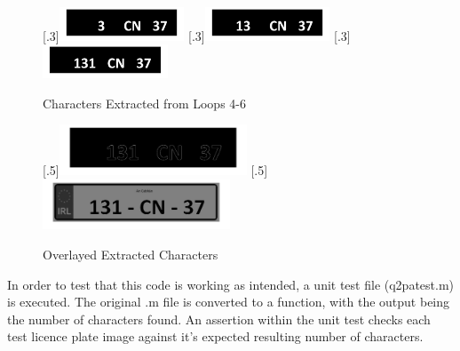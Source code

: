 \documentclass[a4paper]{article}
\begin{document}
	\begin{figure}[H]
		\centering
		[.3\linewidth]{\includegraphics[height=1cm]{Results/Q2/NumPlate1/qanumber_plate_1Added4.jpg}}%
		[.3\linewidth]{\includegraphics[height=1cm]{Results/Q2/NumPlate1/qanumber_plate_1Added5.jpg}}%
		[.3\linewidth]{\includegraphics[height=1cm]{Results/Q2/NumPlate1/qanumber_plate_1Added6.jpg}}%
		\caption{Characters Extracted from Loops 4-6}
		\label{fig:}
	\end{figure}
	\begin{figure}[H]
		\centering
		[.5\linewidth]{\includegraphics[height=1.5cm]{Results/Q2/NumPlate1/qanumber_plate_1Canny.jpg}}%
		[.5\linewidth]{\includegraphics[height=1.5cm]{Results/Q2/NumPlate1/qanumber_plate_1Overlay.jpg}}%
		\caption{Overlayed Extracted Characters}
		\label{fig:}
	\end{figure}
	\par In order to test that this code is working as intended, a unit test file
	(q2patest.m) is executed. The original .m file is converted to a
	function, with the output being the number of characters found. An
	assertion within the unit test checks each test licence plate image
	against it's expected resulting number of characters.
\end{document}
